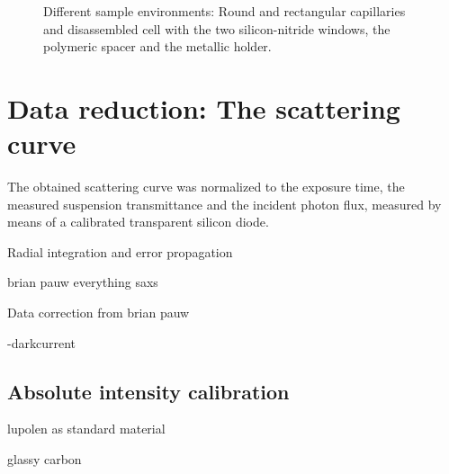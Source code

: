 \begin{figure}%
	\centering
		\caption{Different sample environments: Round and rectangular capillaries and disassembled cell with the two silicon-nitride windows, the polymeric spacer and the metallic holder.}
		\label{fig:SampleEnvironment}
\end{figure}

\section{Data reduction: The scattering curve}

The obtained scattering curve was normalized to the exposure time, the measured suspension transmittance and the incident photon flux, measured by means of a calibrated transparent silicon diode. 

Radial integration and error propagation

brian pauw everything saxs

Data correction from brian pauw

-darkcurrent

\subsection{Absolute intensity calibration}

lupolen as standard material \cite{kratky_absolute_1966,shaffer_calibration_1974}

glassy carbon \cite{perret_glassy_1972}


